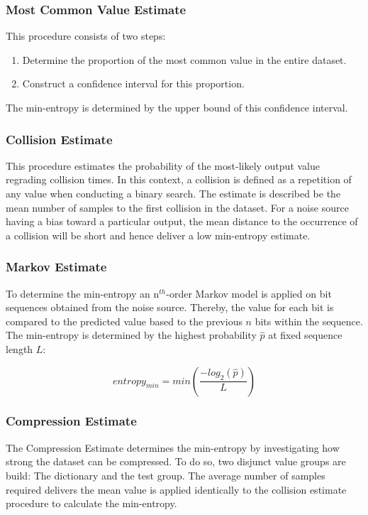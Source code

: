 \subsubsection{Most Common Value Estimate}\label{non-iid-est:mcve}
This procedure consists of two steps:
\begin{enumerate}
	\item Determine the proportion of the most common value in the entire dataset.
	\item Construct a confidence interval for this proportion.
\end{enumerate}
The min-entropy is determined by the upper bound of this confidence interval.

\subsubsection{Collision Estimate}\label{non-iid-est:colle}
This procedure estimates the probability of the most-likely output value regrading collision times. In this context, a collision is defined as a repetition of any value when conducting a binary search. The estimate is described be the mean number of samples to the first collision in the dataset. For a noise source having a bias toward a particular output, the mean distance to the occurrence of a collision will be short and hence deliver a low min-entropy estimate. 

\subsubsection{Markov Estimate}\label{non-iid-est:marke}
To determine the min-entropy an n$^{th}$-order Markov model is applied on bit sequences obtained from the noise source. Thereby, the value for each bit is compared to the predicted value based to the previous $n$ bits within the sequence. The min-entropy is determined by the highest probability $\hat{p}$ at fixed sequence length $L$:

\begin{equation}
entropy_{min} = min(\frac{-log_2(\hat{p})}{L})
\end{equation}

\subsubsection{Compression Estimate}\label{non-iid-est:compe}
The Compression Estimate determines the min-entropy by investigating how strong the dataset can be compressed. To do so, two disjunct value groups are build: The dictionary and the test group. The average number of samples required delivers the mean value is applied identically to the collision estimate procedure to calculate the min-entropy.

